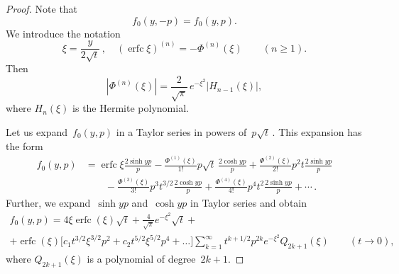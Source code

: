 \documentclass{amsart}
\theoremstyle{plain}
\theoremstyle{definition}
\numberwithin{equation}{section}
\begin{document}
\begin{proof}
Note that
$$
f_0(y,-p)=f_0(y,p).
$$
We introduce the notation
$$
\xi=\frac{y}{2\sqrt{t}}\,,\quad
(\operatorname{erfc}\xi)^{(n)}=-\Phi^{(n)}(\xi)\qquad
(n \geqslant 1).
$$
Then
$$
|\Phi^{(n)}(\xi)|=\frac{2}{\sqrt{\pi}}\,e^{-\xi^2}|H_{n-1}(\xi)|,
$$
where $H_n(\xi)$ is the Hermite polynomial.

Let us expand~$f_0(y,p)$ in a Taylor series in powers
of~$p\sqrt{t}$\,. This expansion has the form
\begin{align*}
f_0(y,p)&=\operatorname{erfc}\xi\frac{2\sinh yp}{p}-
\frac{\Phi^{(1)}(\xi)}{1!}p\sqrt{t}\,\frac{2\cosh yp}{p}+
\frac{\Phi^{(2)}(\xi)}{2!}p^2t\frac{2\sinh yp}{p}
\\
&\qquad-\frac{\Phi^{(3)}(\xi)}{3!}p^3t^{3/2}\frac{2\cosh yp}{p}+
\frac{\Phi^{(4)}(\xi)}{4!}p^4t^2\frac{2\sinh yp}{p}+\cdots\,.
\end{align*}
Further, we expand~$\sinh yp$ and~$\cosh yp$ in Taylor series and
obtain
\begin{multline}\label{eq6.23}
f_0(y,p)=4\xi\operatorname{erfc}(\xi)\sqrt{t}+\frac{4}{\sqrt{\pi}}e^{-\xi^{2}}\sqrt{t}+\\
+\operatorname{erfc}(\xi)\bigl[c_{1}t^{3/2}\xi^{3/2}p^{2}+c_{2}t^{5/2}\xi^{5/2}p^{4}+\ldots\bigr] \sum_{k=1}^\infty t^{k+1/2}p^{2k}e^{-\xi^2}Q_{2k+1}(\xi)\qquad
(t \to 0),
\end{multline}
where $Q_{2k+1}(\xi)$ is a polynomial of degree~$2k+1$.


\end{proof}
\end{document}
